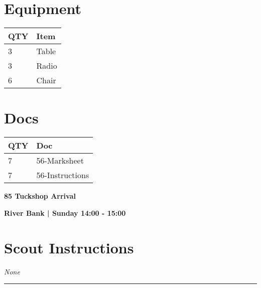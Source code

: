 \documentclass[10pt]{article}
\newcommand{\newtitle}[1]{\begin{center}{\Huge\bfseries #1 }\\ \vspace{5mm}\end{center}}
\newcommand{\newsubtitle}[1]{\begin{center}{\color{grey}\Large\bfseries #1 }\\ \vspace{5mm}\end{center}}
\begin{document}
	\begin{multicols}{2}

		\section*{\faWrench \: Equipment}

		
	\begin{center}
			\begin{tabular}{p{2cm}p{4cm}}


				\textbf{QTY} & \textbf{Item} \\\toprule
												3&Table\\\midrule
												3&Radio\\\midrule
												6&Chair\\\midrule
								\end{tabular}

			\end{center}

		
		\vfill\null
		\columnbreak

			\section*{\faFile \: Docs}
		 	\begin{center}
			\begin{tabular}{p{2cm}p{4cm}}

			\textbf{QTY} & \textbf{Doc} \\\toprule
										7&56-Marksheet\\\midrule
										7&56-Instructions\\\midrule
							\end{tabular}
			\end{center}
	

		\vfill\null

		\end{multicols}



	\vspace{1cm}


	\clearpage
		\newtitle{85 Tuckshop Arrival }
	\newsubtitle{River Bank | Sunday 14:00 - 15:00}
		\setcounter{section}{84}
	\section*{Scout Instructions}
		\textit{None}
	
	\vspace{0.5cm}
	\hrule
	\vspace{0.5cm}
\end{document}
